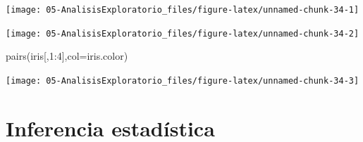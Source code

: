 \documentclass[
]{book}
\newenvironment{Shaded}{\begin{snugshade}}{\end{snugshade}}
\newcommand{\AttributeTok}[1]{\textcolor[rgb]{0.77,0.63,0.00}{#1}}
\newcommand{\DecValTok}[1]{\textcolor[rgb]{0.00,0.00,0.81}{#1}}
\newcommand{\FunctionTok}[1]{\textcolor[rgb]{0.00,0.00,0.00}{#1}}
\newcommand{\NormalTok}[1]{#1}
\newcommand{\OtherTok}[1]{\textcolor[rgb]{0.56,0.35,0.01}{#1}}
\newcommand{\SpecialCharTok}[1]{\textcolor[rgb]{0.00,0.00,0.00}{#1}}
\newcommand{\StringTok}[1]{\textcolor[rgb]{0.31,0.60,0.02}{#1}}
\theoremstyle{break}
\theoremstyle{nonumberplain}
\begin{document}
\begin{center}\texttt{[image: 05-AnalisisExploratorio\_files/figure-latex/unnamed-chunk-34-1]} \end{center}

\begin{Shaded}
\end{Shaded}

\begin{center}\texttt{[image: 05-AnalisisExploratorio\_files/figure-latex/unnamed-chunk-34-2]} \end{center}

\begin{Shaded}
\begin{Highlighting}[]
\FunctionTok{pairs}\NormalTok{(iris[,}\DecValTok{1}\SpecialCharTok{:}\DecValTok{4}\NormalTok{],}\AttributeTok{col=}\NormalTok{iris.color)}
\end{Highlighting}
\end{Shaded}

\begin{center}\texttt{[image: 05-AnalisisExploratorio\_files/figure-latex/unnamed-chunk-34-3]} \end{center}

\hypertarget{inferencia-estaduxedstica}{%
\chapter{Inferencia estadística}\label{inferencia-estaduxedstica}}
\end{document}
